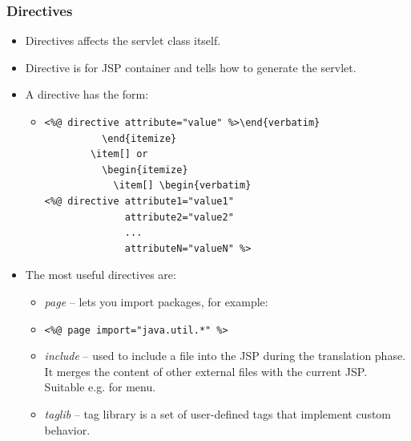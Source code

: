 \documentclass[10pt,xcolor=pdflatex]{beamer}
\begin{document}
\begin{frame}[containsverbatim]\frametitle{Directives}
	\begin{itemize}
		\item Directives affects the servlet class itself.
        \item Directive is for JSP container and tells how to generate the servlet.
		\item A directive has the form:
          \begin{itemize}
        	\item[] \begin{verbatim}
<%@ directive attribute="value" %>\end{verbatim}
          \end{itemize}
        \item[] or
          \begin{itemize}
        	\item[] \begin{verbatim}
<%@ directive attribute1="value1"  
              attribute2="value2"
              ...
              attributeN="valueN" %>
\end{verbatim}
          \end{itemize}
    \item The most useful directives are:
      \begin{itemize}
    	\item \emph{page} -- lets you import packages, for example:
        \item[] \texttt{<\%@ page import="java.util.*" \%>}
    \item \emph{include} -- used to include a file into the JSP during the translation phase. It merges the content of other external files with the current JSP. Suitable e.g. for menu.
    \item \emph{taglib} -- tag library is a set of user-defined tags that implement custom behavior.
      \end{itemize}
    \end{itemize}
\end{frame}
\end{document}
